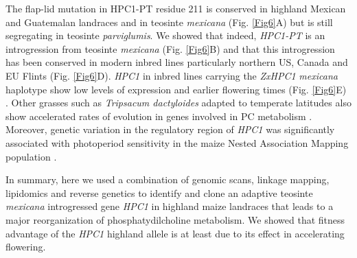 \documentclass[9pt,twocolumn,twoside,lineno]{BioRxiv}
\begin{document}
The flap-lid mutation in HPC1-PT residue 211 is conserved in highland Mexican and Guatemalan landraces and in teosinte \textit{mexicana} (Fig. \ref{Fig6}A) but is still segregating in teosinte \textit{parviglumis}. 
We showed that indeed, \textit{HPC1-PT} is an introgression from teosinte \textit{mexicana} (Fig. \ref{Fig6}B) and that this introgression has been conserved in modern inbred lines particularly northern US, Canada and EU Flints (Fig. \ref{Fig6}D). 
\textit{HPC1} in inbred lines carrying the \textit{ZxHPC1} \textit{mexicana} haplotype show low levels of expression and earlier flowering times (Fig. \ref{Fig6}E) \cite{Kremling2018-gn}. 
Other grasses such as \textit{Tripsacum dactyloides} adapted to temperate latitudes also show accelerated rates of evolution in genes involved in PC metabolism \cite{Yan2019-tx}.
Moreover, genetic variation in the regulatory region of \textit{HPC1} was significantly associated with photoperiod sensitivity in the maize Nested Association Mapping population \cite{Hung2012-ms}. 

In summary, here we used a combination of genomic scans, linkage mapping, lipidomics and reverse genetics to identify and clone an adaptive teosinte \textit{mexicana} introgressed gene \textit{HPC1} in highland maize landraces that leads to a major reorganization of phosphatydilcholine metabolism. 
We showed that fitness advantage of the \textit{HPC1} highland allele is at least due to its effect in accelerating flowering.

\end{document}
